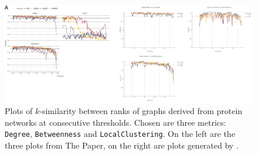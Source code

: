 \begin{figure}
    \includegraphics[width=\linewidth]{plot_rank_similarity.png}
    \caption{Plots of $k$-similarity between ranks of graphs derived from protein networks at consecutive thresholds.
    Chosen are three metrics: \texttt{Degree}, \texttt{Betweenness} and \texttt{LocalClustering}.
    On the left are the three plots from The Paper, on the right are plots generated by \graffs.}
    \label{fig:plot_rank_similarity}
    \footnotesize
    \begin{flushleft}
    \end{flushleft}
\end{figure}
